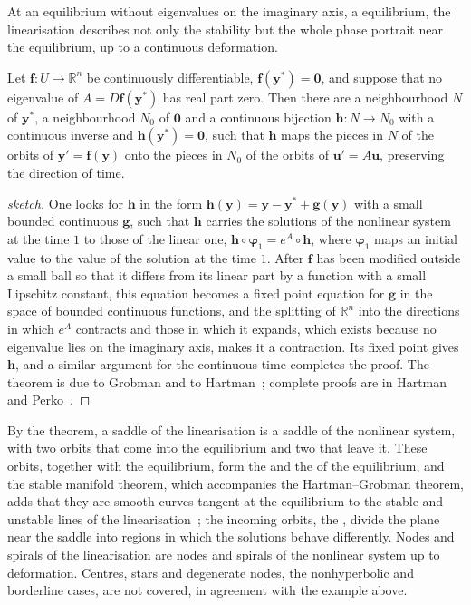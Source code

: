 At an equilibrium without eigenvalues on the imaginary axis, a  equilibrium, the linearisation describes not only the stability but the whole phase portrait near the equilibrium, up to a continuous deformation.

\begin{theorem}
\label{thm:hartman-grobman}
Let $\mathbf f\colon U\to\mathbb R^n$ be continuously differentiable, $\mathbf f(\mathbf y^*)=\mathbf 0$, and suppose that no eigenvalue of $A=D\mathbf f(\mathbf y^*)$ has real part zero. Then there are a neighbourhood $N$ of $\mathbf y^*$, a neighbourhood $N_0$ of $\mathbf 0$ and a continuous bijection $\mathbf h\colon N\to N_0$ with a continuous inverse and $\mathbf h(\mathbf y^*)=\mathbf 0$, such that $\mathbf h$ maps the pieces in $N$ of the orbits of $\mathbf y'=\mathbf f(\mathbf y)$ onto the pieces in $N_0$ of the orbits of $\mathbf u'=A\mathbf u$, preserving the direction of time.
\end{theorem}

\begin{proof}[sketch]
One looks for $\mathbf h$ in the form $\mathbf h(\mathbf y)=\mathbf y-\mathbf y^*+\mathbf g(\mathbf y)$ with a small bounded continuous $\mathbf g$, such that $\mathbf h$ carries the solutions of the nonlinear system at the time $1$ to those of the linear one, $\mathbf h\circ\boldsymbol\varphi_1=e^A\circ\mathbf h$, where $\boldsymbol\varphi_1$ maps an initial value to the value of the solution at the time $1$. After $\mathbf f$ has been modified outside a small ball so that it differs from its linear part by a function with a small Lipschitz constant, this equation becomes a fixed point equation for $\mathbf g$ in the space of bounded continuous functions, and the splitting of $\mathbb R^n$ into the directions in which $e^A$ contracts and those in which it expands, which exists because no eigenvalue lies on the imaginary axis, makes it a contraction. Its fixed point gives $\mathbf h$, and a similar argument for the continuous time completes the proof. The theorem is due to Grobman and to Hartman~\cite{grobman1959,hartman1960}; complete proofs are in Hartman~\cite[Chap.~IX]{hartman2002} and Perko~\cite[Chap.~2]{perko2001}.
\end{proof}

By the theorem, a saddle of the linearisation is a saddle of the nonlinear system, with two orbits that come into the equilibrium and two that leave it. These orbits, together with the equilibrium, form the  and the  of the equilibrium, and the stable manifold theorem, which accompanies the Hartman--Grobman theorem, adds that they are smooth curves tangent at the equilibrium to the stable and unstable lines of the linearisation~\cite[Chap.~2]{perko2001}; the incoming orbits, the , divide the plane near the saddle into regions in which the solutions behave differently. Nodes and spirals of the linearisation are nodes and spirals of the nonlinear system up to deformation. Centres, stars and degenerate nodes, the nonhyperbolic and borderline cases, are not covered, in agreement with the example above.

